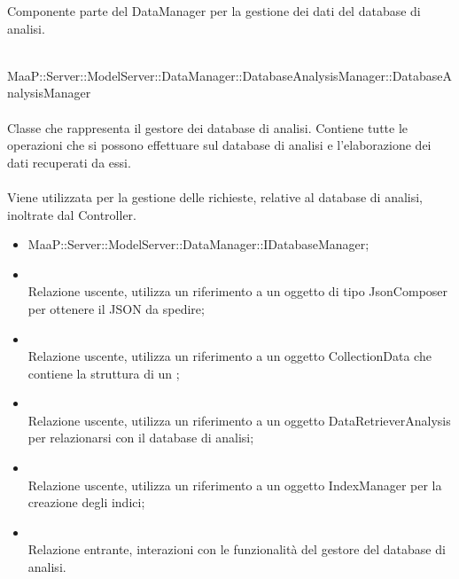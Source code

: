 Componente parte del DataManager per la gestione dei dati del database di analisi.

\\
MaaP::Server::ModelServer::DataManager::DatabaseAnalysisManager::DatabaseAnalysisManager\\
\\
Classe che rappresenta il gestore dei database di analisi. Contiene tutte le operazioni che si possono effettuare sul database di analisi e l'elaborazione dei dati recuperati da essi.\\
\\
Viene utilizzata per la gestione delle richieste, relative al database di analisi, inoltrate dal Controller.
\begin{itemize}
\item MaaP::Server::ModelServer::DataManager::IDatabaseManager;
\end{itemize}
\begin{itemize}
\item{}\\
Relazione uscente, utilizza un riferimento a un oggetto di tipo JsonComposer per ottenere il JSON da spedire;
\item{}\\
Relazione uscente, utilizza un riferimento a un oggetto CollectionData che contiene la struttura di un ;
\item{}\\
Relazione uscente, utilizza un riferimento a un oggetto DataRetrieverAnalysis per relazionarsi con il database di analisi;
\item{}\\
Relazione uscente, utilizza un riferimento a un oggetto IndexManager per la creazione degli indici;
\item{}\\
Relazione entrante, interazioni con le funzionalità del gestore del database di analisi.
\end{itemize}

